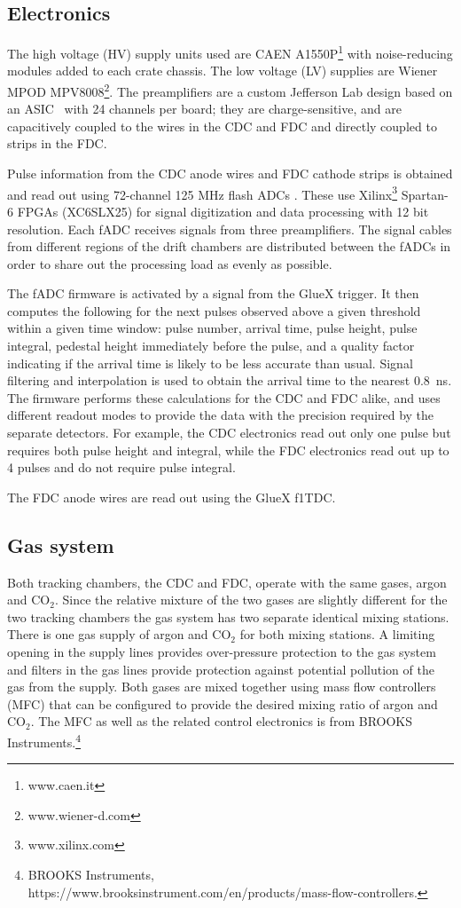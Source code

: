 \subsection{Electronics \label{sec:dcelectronics}}
The high voltage (HV) supply units used are CAEN A1550P\footnote{www.caen.it} with noise-reducing modules added to each crate chassis. 
The low voltage (LV) supplies are Wiener MPOD MPV8008\footnote{www.wiener-d.com}. 
The preamplifiers are a custom Jefferson Lab design based on an ASIC~\cite{hdnote2515}
with 24 channels per board; they are charge-sensitive, and are capacitively coupled to the wires in the CDC and FDC and directly coupled to strips in the FDC. 

Pulse information from the CDC anode wires and FDC cathode strips is obtained and read out using 72-channel 125 MHz flash ADCs \cite{Visser2008,5873864}. These use Xilinx\footnote{www.xilinx.com} Spartan-6 FPGAs (XC6SLX25) for signal digitization and data processing with 12 bit resolution.
Each fADC receives signals from three preamplifiers. 
The signal cables from different regions of the drift chambers are distributed between the fADCs in order to share out the processing load as evenly as possible.  

The fADC firmware is activated by a signal from the GlueX trigger. It then computes the following for the next pulses observed above a given threshold within a given time window: pulse number, arrival time, pulse height, pulse integral, pedestal height immediately before the pulse, and a quality factor indicating if the arrival time is likely to be less accurate than usual. 
Signal filtering and interpolation is used to obtain the arrival time to the nearest 0.8~ns. 
The firmware performs these calculations for the CDC and FDC alike, and uses different readout modes to provide the data with the precision required by the separate detectors. 
For example, the CDC electronics read out only one pulse but requires both pulse height and integral, while the FDC electronics read out up to 4 pulses and do not require pulse integral.  

The FDC anode wires are read out using the GlueX f1TDC\cite{JLAB2002}. 

\subsection[Gas system]{Gas system \label{sec:gas}}
Both tracking chambers, the CDC and FDC, operate with the same gases, argon and CO$_{2}$. Since the relative mixture of
the two gases are slightly different for the two tracking chambers the gas system has two separate identical mixing stations. There is one gas supply of argon and CO$_{2}$ for both mixing stations. A limiting opening in the supply
lines provides over-pressure protection to the gas system and filters in the gas lines provide protection against potential
pollution of the gas from the supply. Both gases are mixed together using mass flow controllers (MFC) that can be 
configured
to provide the desired mixing ratio of argon and CO$_{2}$.  The MFC as well as the related control electronics is from
BROOKS Instruments.\footnote{BROOKS Instruments, https://www.brooksinstrument.com/en/products/mass-flow-controllers.}

